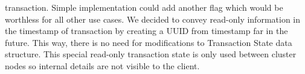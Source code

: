  transaction. Simple implementation could add another flag which would be worthless for all other use cases. We decided to convey read-only information in the timestamp of transaction by creating a UUID from timestamp far in the future. This way, there is no need for modifications to Transaction State data structure. This special read-only transaction state is only used between cluster nodes so internal details are not visible to the client.








